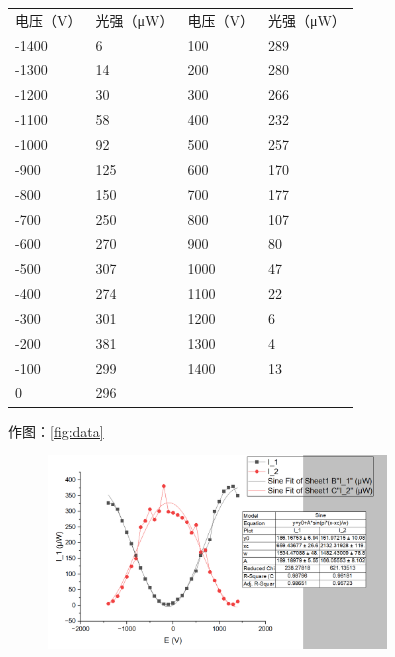 \documentclass[font=default]{mpltx}
\begin{document}
\begin{table}[]
\begin{tabular}{llll}
电压（V）                      & 光强（μW）                   & 电压（V） & 光强（μW） \\
-1400                      & 6                        & 100   & 289    \\
-1300                      & 14                       & 200   & 280    \\
-1200                      & 30                       & 300   & 266    \\
-1100                      & 58                       & 400   & 232    \\
-1000                      & 92                       & 500   & 257    \\
-900                       & 125                      & 600   & 170    \\ \cline{1-2}
\multicolumn{1}{|l|}{-800} & \multicolumn{1}{l|}{150} & 700   & 177    \\ \cline{1-2}
-700                       & 250                      & 800   & 107    \\
-600                       & 270                      & 900   & 80     \\
-500                       & 307                      & 1000  & 47     \\
-400                       & 274                      & 1100  & 22     \\
-300                       & 301                      & 1200  & 6      \\
-200                       & 381                      & 1300  & 4      \\
-100                       & 299                      & 1400  & 13     \\
0                          & 296                      &       &       
\end{tabular}
\end{table}

作图：\autoref{fig:data}

\begin{figure}
  \centering
  \includegraphics[width=0.8\textwidth]{fig/data1(1).png}
  \label{fig:data}
\end{figure}
\end{document}
